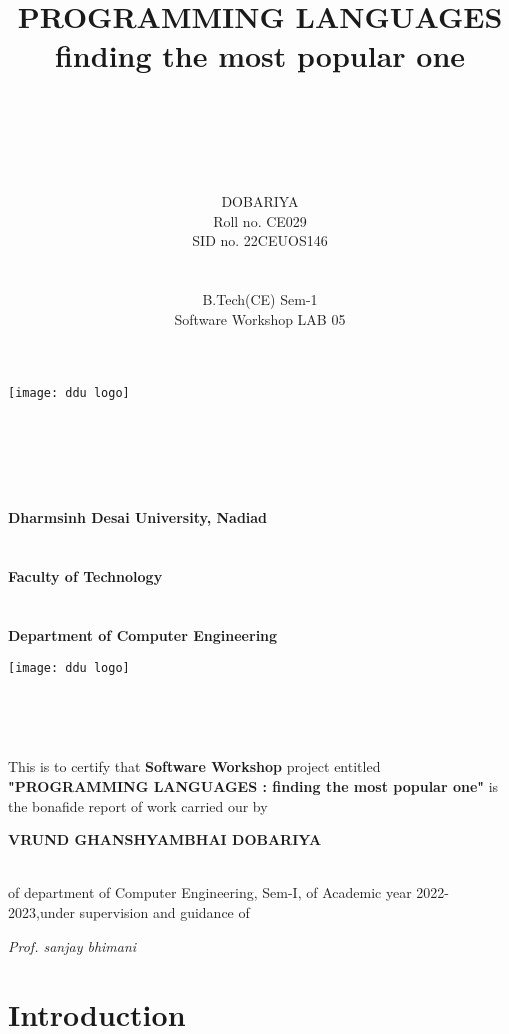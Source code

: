 \documentclass[a4paper, 12pt]{report}
\title{\textbf{\Huge{PROGRAMMING} LANGUAGES\\finding the most popular one}}
\date{}
\author{\\ \\ \\ \\ \\ \Large{\bftext{VRUND GHANSHYAMBHAI} DOBARIYA} \\\large{Roll no. CE029 }\\
\large{SID no. 22CEUOS146} \\ \\ \\ B.Tech(CE) Sem-1 \\ \large{Software Workshop LAB 05}}
\begin{document}
\maketitle
\begin{center}
\texttt{[image: ddu logo]}
\end{center}
\\
\\
\\
\\
\begin{centering}
\large{\textbf{Dharmsinh Desai University,
Nadiad}} \\
\\
\\
{\textbf{Faculty of Technology}}\\
\\
\\
{\textbf{Department of Computer Engineering \\}}
\end{centering}
\newpage
\begin{center}
\begin{center}
\texttt{[image: ddu logo]}
\end{center}
\textbf{\Huge{\underline{}}} \\ 
\end{center} \\
\Large{
This is to certify that \textbf{Software Workshop} project entitled \textbf{"PROGRAMMING LANGUAGES : finding the most popular one"} is the bonafide report of work carried our by \\
\begin{center}
\textbf{{VRUND GHANSHYAMBHAI DOBARIYA}}
\end{center}\\
of department of Computer Engineering, Sem-I, of Academic year 2022-2023,under supervision and 
guidance of \\
\begin{center}
\textit{Prof. sanjay bhimani} 
\end{center}
}
\tableofcontents
\chapter{Introduction}
\end{document}
